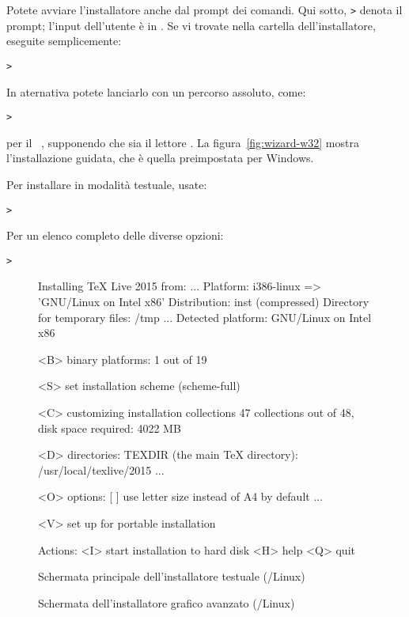 \documentclass{article}
\begin{document}
Potete avviare l'installatore anche dal prompt dei comandi. Qui sotto,
\texttt{>} denota il prompt; l'input dell'utente è in
. Se vi trovate nella cartella dell'installatore,
eseguite semplicemente:
\begin{alltt}
> 
\end{alltt}

In aternativa potete lanciarlo con un percorso assoluto, come:
\begin{alltt}
> 
\end{alltt}
per il \DVD\ \TK, supponendo che  sia il lettore \DVD. La
figura~\ref{fig:wizard-w32} mostra l'installazione guidata, che è quella
preimpostata per Windows.

Per installare in modalità testuale, usate:
\begin{alltt}
> 
\end{alltt}

Per un elenco completo delle diverse opzioni:
\begin{alltt}
> 
\end{alltt}

\begin{figure}[tb]
\begin{boxedverbatim}
Installing TeX Live 2015 from: ...
Platform: i386-linux => 'GNU/Linux on Intel x86'
Distribution: inst (compressed)
Directory for temporary files: /tmp
...
 Detected platform: GNU/Linux on Intel x86

 <B> binary platforms: 1 out of 19

 <S> set installation scheme (scheme-full)

 <C> customizing installation collections
     47 collections out of 48, disk space required: 4022 MB

 <D> directories:
   TEXDIR (the main TeX directory):
     /usr/local/texlive/2015
   ...

 <O> options:
   [ ] use letter size instead of A4 by default
   ...

 <V> set up for portable installation

Actions:
 <I> start installation to hard disk
 <H> help
 <Q> quit
\end{boxedverbatim}
\caption{Schermata principale dell'installatore testuale
  (\GNU/Linux)}\label{fig:text-main}
\end{figure}

\begin{figure}[tb]
\caption{Schermata dell'installatore grafico avanzato
  (\GNU/Linux)}\label{fig:gui-main}
\end{figure}
\end{document}
